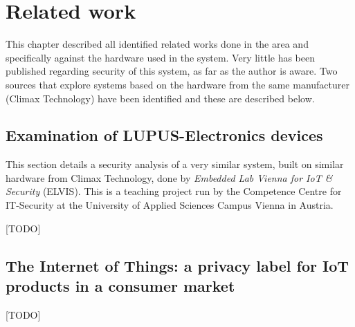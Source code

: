 \chapter{Related work} \label{ch:related-work}
This chapter described all identified related works done in the area and specifically against the hardware used in the system. Very little has been published regarding security of this system, as far as the author is aware. Two sources that explore systems based on the hardware from the same manufacturer (Climax Technology) have been identified and these are described below.

\section{Examination of LUPUS-Electronics devices}
This section details a security analysis of a very similar system, built on similar hardware from Climax Technology, done by \textit{Embedded Lab Vienna for IoT \& Security} (ELVIS). This is a teaching project run by the Competence Centre for IT-Security at the University of Applied Sciences Campus Vienna in Austria.

[TODO] \cite{labvienna}

\section{The Internet of Things: a privacy label for IoT products in a consumer market}
[TODO] \cite{iotprivacylabel}